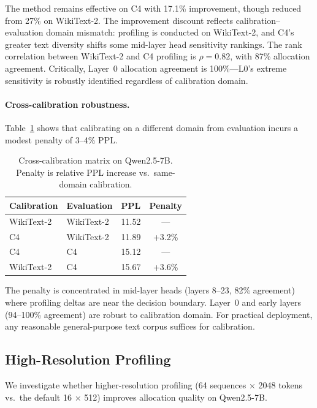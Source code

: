 \documentclass[11pt,a4paper]{article}
\begin{document}
The method remains effective on C4 with 17.1\% improvement, though reduced from 27\% on WikiText-2.
The improvement discount reflects calibration--evaluation domain mismatch: profiling is conducted on WikiText-2, and C4's greater text diversity shifts some mid-layer head sensitivity rankings.
The rank correlation between WikiText-2 and C4 profiling is $\rho = 0.82$, with 87\% allocation agreement.
Critically, Layer~0 allocation agreement is 100\%---L0's extreme sensitivity is robustly identified regardless of calibration domain.

\paragraph{Cross-calibration robustness.}
Table~\ref{tab:cross_calib} shows that calibrating on a different domain from evaluation incurs a modest penalty of 3--4\% PPL.

\begin{table}[t]
\centering
\small
\caption{Cross-calibration matrix on Qwen2.5-7B. Penalty is relative PPL increase vs.\ same-domain calibration.}
\label{tab:cross_calib}
\begin{tabular}{llcc}
\toprule
\textbf{Calibration} & \textbf{Evaluation} & \textbf{PPL} & \textbf{Penalty} \\
\midrule
WikiText-2 & WikiText-2 & 11.52 & --- \\
C4         & WikiText-2 & 11.89 & +3.2\% \\
C4         & C4         & 15.12 & --- \\
WikiText-2 & C4         & 15.67 & +3.6\% \\
\bottomrule
\end{tabular}
\end{table}

The penalty is concentrated in mid-layer heads (layers 8--23, 82\% agreement) where profiling deltas are near the decision boundary.
Layer~0 and early layers (94--100\% agreement) are robust to calibration domain.
For practical deployment, any reasonable general-purpose text corpus suffices for calibration.

\subsection{High-Resolution Profiling}
\label{sec:hires}

We investigate whether higher-resolution profiling (64 sequences $\times$ 2048 tokens vs.\ the default 16 $\times$ 512) improves allocation quality on Qwen2.5-7B.
\end{document}
